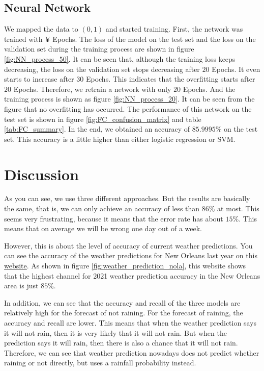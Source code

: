 \documentclass[11pt, a4paper, jou]{apa7}
\begin{document}
\subsection{Neural Network}
We mapped the data to $(0,1)$ and started training. First, the network was trained with ¥ Epochs. The loss of the model on the test set and the loss on the validation set during the training process are shown in figure \ref{fig:NN_process_50}. It can be seen that, although the training loss keeps decreasing, the loss on the validation set stops decreasing after $20$ Epochs. It even starts to increase after $30$ Epochs. This indicates that the overfitting starts after $20$ Epochs. Therefore, we retrain a network with only $20$ Epochs. And the training process is shown as figure \ref{fig:NN_process_20}. It can be seen from the figure that no overfitting has occurred. The performance of this network on the test set is shown in figure \ref{fig:FC_confusion_matrix} and table \ref{tab:FC_summary}. In the end, we obtained an accuracy of $85.9995\%$ on the test set. This accuracy is a little higher than either logistic regression or SVM. 

\section{Discussion}

As you can see, we use three different approaches. But the results are basically the same, that is, we can only achieve an accuracy of less than $86\%$ at most. This seems very frustrating, because it means that the error rate has about $15\%$. This means that on average we will be wrong one day out of a week. 

However, this is about the level of accuracy of current weather predictions. You can see the accuracy of the weather predictions for New Orleans last year on this \href{https://www.forecastadvisor.com/Louisiana/NewOrleans/70112/}{website}. As shown in figure \ref{fig:weather_prediction_nola}, this website shows that the highest channel for 2021 weather prediction accuracy in the New Orleans area is just $85\%$. 

In addition, we can see that the accuracy and recall of the three models are relatively high for the forecast of not raining. For the forecast of raining, the accuracy and recall are lower. This means that when the weather prediction says it will not rain, then it is very likely that it will not rain. But when the prediction says it will rain, then there is also a chance that it will not rain. Therefore, we can see that weather prediction nowadays does not predict whether raining or not directly, but uses a rainfall probability instead. 
\end{document}
